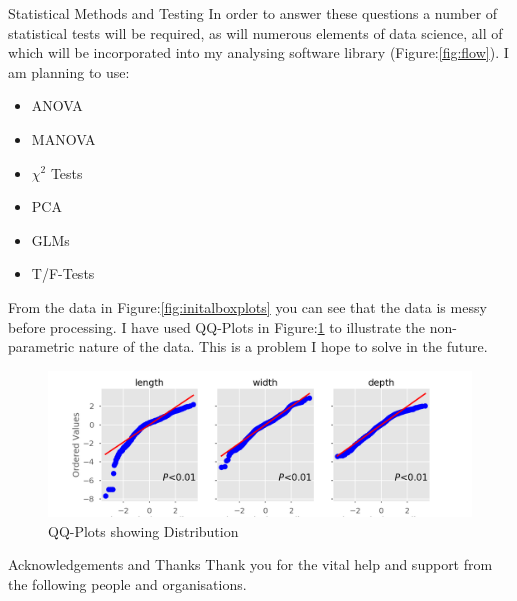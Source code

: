 \documentclass[final]{beamer}
\begin{document}
\begin{frame}{}
\begin{textblock}{28}
\begin{block}{Statistical Methods and Testing}
      In order to answer these questions a number of statistical tests will be required,
      as will numerous elements of data science, all of which will be incorporated into
      my analysing software library (Figure:\ref{fig:flow}). I am planning to use:

      \begin{multicols}{2}

        \begin{itemize}
        \item ANOVA
        \item MANOVA
        \item $\chi^2$ Tests
        \end{itemize}

        \columnbreak

        \begin{itemize}
        \item PCA
        \item GLMs
        \item T/F-Tests
        \end{itemize}

      \end{multicols}

      From the data in Figure:\ref{fig:initalboxplots} you can see that the data is
      messy before processing. I have used QQ-Plots in Figure:\ref{fig:qq} to illustrate
      the non-parametric nature of the data. This is a problem I hope to solve in the future.
        \begin{figure}[htb]
          \centering
          \includegraphics[width=22cm]{qqplots.png}
          \caption{\label{fig:qq} QQ-Plots showing Distribution}
        \end{figure}       
      
    \end{block}
    
    
    \begin{block}{Acknowledgements and Thanks}
      Thank you for the vital help and support from the following people and organisations.


\end{block}
\end{textblock}
\end{frame}
\end{document}
